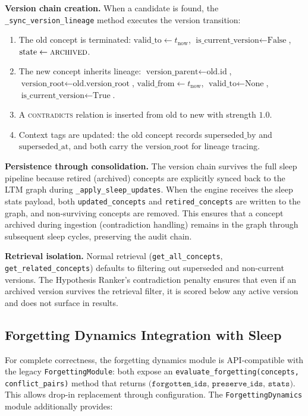 \documentclass[11pt,twocolumn]{article}
\begin{document}
\textbf{Version chain creation.} When a candidate is found, the \texttt{\_sync\_version\_lineage} method executes the version transition:

\begin{enumerate}
\item The old concept is terminated: $\text{valid\_to} \leftarrow t_{\text{now}}$, $\text{is\_current\_version} \leftarrow \text{False}$, $\text{state} \leftarrow \textsc{archived}$.
\item The new concept inherits lineage: $\text{version\_parent} \leftarrow \text{old.id}$, $\text{version\_root} \leftarrow \text{old.version\_root}$, $\text{valid\_from} \leftarrow t_{\text{now}}$, $\text{valid\_to} \leftarrow \text{None}$, $\text{is\_current\_version} \leftarrow \text{True}$.
\item A \textsc{contradicts} relation is inserted from old to new with strength $1.0$.
\item Context tags are updated: the old concept records $\text{superseded\_by}$ and $\text{superseded\_at}$, and both carry the $\text{version\_root}$ for lineage tracing.
\end{enumerate}

\textbf{Persistence through consolidation.} The version chain survives the full sleep pipeline because retired (archived) concepts are explicitly synced back to the LTM graph during \texttt{\_apply\_sleep\_updates}. When the engine receives the sleep stats payload, both \texttt{updated\_concepts} and \texttt{retired\_concepts} are written to the graph, and non-surviving concepts are removed. This ensures that a concept archived during ingestion (contradiction handling) remains in the graph through subsequent sleep cycles, preserving the audit chain.

\textbf{Retrieval isolation.} Normal retrieval (\texttt{get\_all\_concepts}, \texttt{get\_related\_concepts}) defaults to filtering out superseded and non-current versions. The Hypothesis Ranker's contradiction penalty ensures that even if an archived version survives the retrieval filter, it is scored below any active version and does not surface in results.

\subsection{Forgetting Dynamics Integration with Sleep}

For complete correctness, the forgetting dynamics module is API-compatible with the legacy \texttt{ForgettingModule}: both expose an \texttt{evaluate\_forgetting(concepts, conflict\_pairs)} method that returns $\texttt{(forgotten\_ids, preserve\_ids, stats)}$. This allows drop-in replacement through configuration. The \texttt{ForgettingDynamics} module additionally provides:
\end{document}
